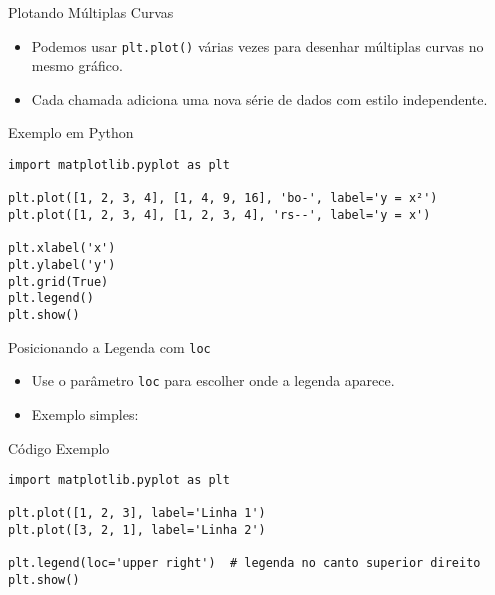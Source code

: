 \begin{frame}[fragile]{Plotando Múltiplas Curvas}
    \begin{itemize}
        \item Podemos usar \texttt{plt.plot()} várias vezes para desenhar múltiplas curvas no mesmo gráfico.
        \item Cada chamada adiciona uma nova série de dados com estilo independente.
    \end{itemize}

    \begin{block}{Exemplo em Python}
        \begin{verbatim}
import matplotlib.pyplot as plt

plt.plot([1, 2, 3, 4], [1, 4, 9, 16], 'bo-', label='y = x²')
plt.plot([1, 2, 3, 4], [1, 2, 3, 4], 'rs--', label='y = x')

plt.xlabel('x')
plt.ylabel('y')
plt.grid(True)
plt.legend()
plt.show()
\end{verbatim}
    \end{block}
\end{frame}

\begin{frame}[fragile]{Posicionando a Legenda com \texttt{loc}}
    \begin{itemize}
        \item Use o parâmetro \texttt{loc} para escolher onde a legenda aparece.
        \item Exemplo simples:
    \end{itemize}

    \begin{block}{Código Exemplo}
        \begin{verbatim}
import matplotlib.pyplot as plt

plt.plot([1, 2, 3], label='Linha 1')
plt.plot([3, 2, 1], label='Linha 2')

plt.legend(loc='upper right')  # legenda no canto superior direito
plt.show()
\end{verbatim}
    \end{block}
\end{frame}

